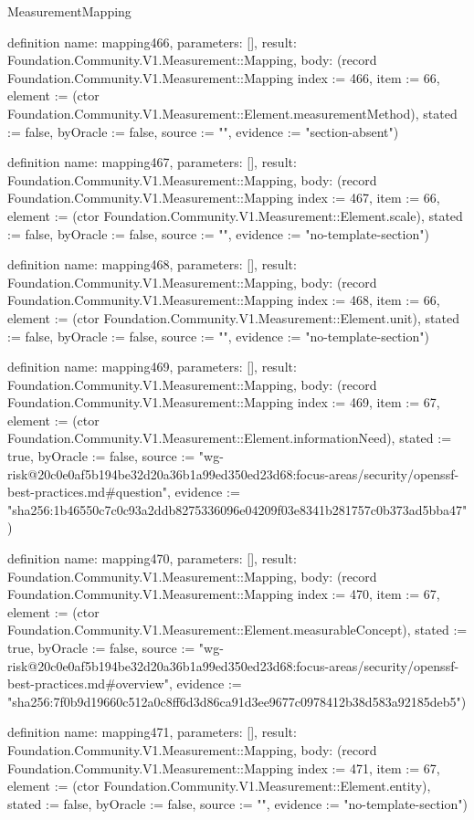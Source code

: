 \begin{lexlean}{MeasurementMapping}
\begin{semanticmodule}
definition{
  name: mapping466,
  parameters: [],
  result: Foundation.Community.V1.Measurement::Mapping,
  body: (record Foundation.Community.V1.Measurement::Mapping {index := 466, item := 66, element := (ctor Foundation.Community.V1.Measurement::Element.measurementMethod), stated := false, byOracle := false, source := "", evidence := "section-absent"})
}

definition{
  name: mapping467,
  parameters: [],
  result: Foundation.Community.V1.Measurement::Mapping,
  body: (record Foundation.Community.V1.Measurement::Mapping {index := 467, item := 66, element := (ctor Foundation.Community.V1.Measurement::Element.scale), stated := false, byOracle := false, source := "", evidence := "no-template-section"})
}

definition{
  name: mapping468,
  parameters: [],
  result: Foundation.Community.V1.Measurement::Mapping,
  body: (record Foundation.Community.V1.Measurement::Mapping {index := 468, item := 66, element := (ctor Foundation.Community.V1.Measurement::Element.unit), stated := false, byOracle := false, source := "", evidence := "no-template-section"})
}

definition{
  name: mapping469,
  parameters: [],
  result: Foundation.Community.V1.Measurement::Mapping,
  body: (record Foundation.Community.V1.Measurement::Mapping {index := 469, item := 67, element := (ctor Foundation.Community.V1.Measurement::Element.informationNeed), stated := true, byOracle := false, source := "wg-risk@20c0e0af5b194be32d20a36b1a99ed350ed23d68:focus-areas/security/openssf-best-practices.md#question", evidence := "sha256:1b46550c7c0c93a2ddb8275336096e04209f03e8341b281757c0b373ad5bba47"})
}

definition{
  name: mapping470,
  parameters: [],
  result: Foundation.Community.V1.Measurement::Mapping,
  body: (record Foundation.Community.V1.Measurement::Mapping {index := 470, item := 67, element := (ctor Foundation.Community.V1.Measurement::Element.measurableConcept), stated := true, byOracle := false, source := "wg-risk@20c0e0af5b194be32d20a36b1a99ed350ed23d68:focus-areas/security/openssf-best-practices.md#overview", evidence := "sha256:7f0b9d19660c512a0c8ff6d3d86ca91d3ee9677c0978412b38d583a92185deb5"})
}

definition{
  name: mapping471,
  parameters: [],
  result: Foundation.Community.V1.Measurement::Mapping,
  body: (record Foundation.Community.V1.Measurement::Mapping {index := 471, item := 67, element := (ctor Foundation.Community.V1.Measurement::Element.entity), stated := false, byOracle := false, source := "", evidence := "no-template-section"})
}


\end{semanticmodule}
\end{lexlean}
